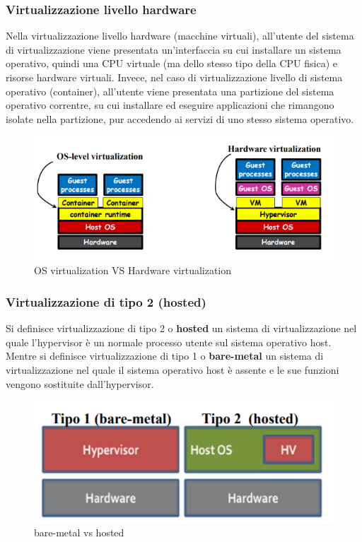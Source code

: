 \documentclass[12pt,a4paper,twoside]{book}
\begin{document}
\subsubsection{Virtualizzazione livello hardware}
Nella virtualizzazione livello hardware (macchine virtuali), all'utente del sistema di virtualizzazione viene presentata un'interfaccia su cui installare un sistema operativo, quindi una CPU virtuale (ma dello stesso tipo della CPU fisica) e risorse hardware virtuali.
Invece, nel caso di virtualizzazione livello di sistema operativo (container), all'utente viene presentata una partizione del sistema operativo correntre, su cui installare ed eseguire applicazioni che rimangono isolate nella partizione, pur accedendo ai servizi di uno stesso sistema operativo.
\begin{figure}[H]
    \centering
    \includegraphics[width=.8\linewidth]{img/hardware-os_virtualization.png}
    \caption{OS virtualization VS Hardware virtualization}
    \label{fig:hardware-os_virtualization}
\end{figure}

\subsubsection{Virtualizzazione di tipo 2 (hosted)}
Si definisce virtualizzazione di tipo 2 o \textbf{hosted} un sistema di virtualizzazione nel quale l'hypervisor è un normale processo utente sul sistema operativo host. Mentre si definisce virtualizzazione di tipo 1 o \textbf{bare-metal} un sistema di virtualizzazione nel quale il sistema operativo host è assente e le sue funzioni vengono sostituite dall'hypervisor.
\begin{figure}[H]
    \centering
    \includegraphics[width=.8\linewidth]{img/bare-metal_hosted.png}
    \caption{bare-metal vs hosted}
    \label{fig:bare-metal_hosted}
\end{figure}
\end{document}
